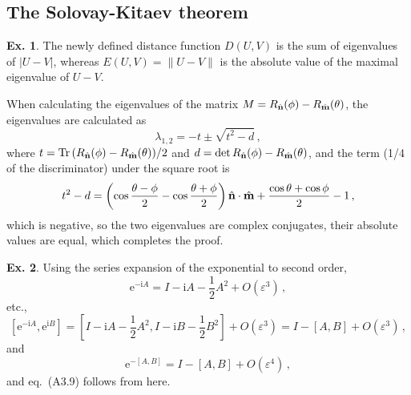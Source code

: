 \documentclass[a4paper,12pt]{article}
\def\e{\mathrm{e}}
\def\imagi{\mathrm{i}}
\def\Tr{\ensuremath{\mathop{\rm Tr}}{}}
\theoremstyle{definition}
\newtheorem{exercise}{Ex.}[section]
\begin{document}
\subsection{The Solovay-Kitaev theorem}\label{app:SolovayKitaevTheorem}

\begin{exercise}\label{ex:3.1}
 The newly defined distance function $D(U, V)$ is the sum of eigenvalues of $|U-V|$, whereas $E(U, V)=\|U-V\|$ is the absolute value of the maximal eigenvalue of $U-V$.

 When calculating the eigenvalues of the matrix $M = R_{\hat{\bf n}}(\phi)-R_{\hat{\bf m}}(\theta)$, the eigenvalues are calculated as
 \[
  \lambda_{1,2} = -t \pm \sqrt{t^2 - d}\,,
 \]
 where $t=\Tr(R_{\hat{\bf n}}(\phi)-R_{\hat{\bf m}}(\theta))/2$ and $d=\det R_{\hat{\bf n}}(\phi)-R_{\hat{\bf m}}(\theta)$, and the term (1/4 of the discriminator) under the square root is
 \[
  t^2-d%
  = \left(\cos\frac{\theta-\phi}{2}-\cos\frac{\theta+\phi}{2}\right){\hat{\bf n}}\cdot{\hat{\bf m}}+\frac{\cos\theta+\cos\phi}{2}-1\,,
 \]
 which is negative, so the two eigenvalues are complex conjugates, their absolute values are equal, which completes the proof.
\end{exercise}

\begin{exercise}
 Using the series expansion of the exponential to second order,
 \[
  \e^{-\imagi A} = I - \imagi A-\frac{1}{2}A^2+O(\varepsilon^3)\,,
 \]
 etc.,
 \[
  \left[\e^{-\imagi A}, \e^{\imagi B}\right] = \left[ I -\imagi A-\frac{1}{2}A^2,I -\imagi B-\frac{1}{2}B^2\right]+O(\varepsilon^3) = I-[A,B]+O(\varepsilon^3)\,,
 \]
 and
 \[
  \e^{-[A,B]} = I-[A,B]+O(\varepsilon^4)\,,
 \]
 and eq.\ (A3.9) follows from here.
\end{exercise}
\end{document}
